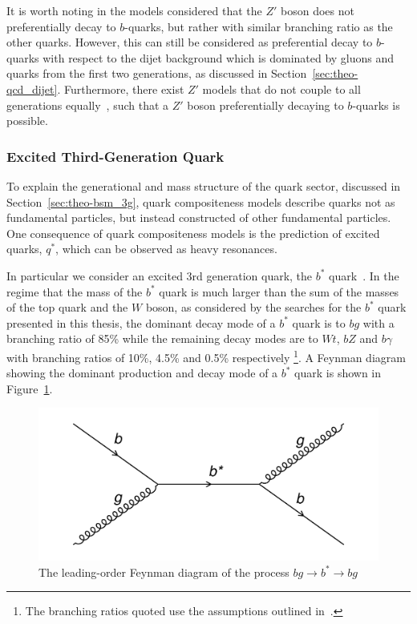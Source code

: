 It is worth noting in the models considered that the $Z'$ boson does not preferentially decay to $b$-quarks, but rather with similar branching ratio as the other quarks.
However, this can still be considered as preferential decay to $b$-quarks with respect to the dijet background
which is dominated by gluons and quarks from the first two generations, as discussed in Section~\ref{sec:theo-qcd_dijet}.
Furthermore, there exist $Z'$ models that do not couple to all generations equally~\cite{theo-bsm_zprime_3g},
such that a $Z'$ boson preferentially decaying to $b$-quarks is possible.

\subsubsection{Excited Third-Generation Quark}
\label{sec:theo-bsm_bstar}

To explain the generational and mass structure of the quark sector, discussed in Section~\ref{sec:theo-bsm_3g},
quark compositeness models describe quarks not as fundamental particles, but instead constructed of other fundamental particles.
One consequence of quark compositeness models is the prediction of excited quarks, $q^{*}$, which can be observed as heavy resonances.

In particular we consider an excited 3rd generation quark, the $b^{*}$ quark~\cite{theo-bsm_bstar}.
In the regime that the mass of the $b^{*}$ quark is much larger than the sum of the masses of the top quark and the $W$ boson,
as considered by the searches for the $b^{*}$ quark presented in this thesis,
the dominant decay mode of a $b^{*}$ quark is to $bg$ with a branching ratio of 85\%
while the remaining decay modes are to $Wt$, $bZ$ and $b\gamma$ with branching ratios of 10\%, 4.5\% and 0.5\% respectively
\footnote{The branching ratios quoted use the assumptions outlined in~\cite{theo-bsm_bstar}.}.
A Feynman diagram showing the  dominant production and decay mode of a $b^*$ quark is shown in Figure~\ref{fig:theo-bsm_bstar}.

\begin{figure}[!hbt]
  \begin{center}
    \includegraphics[width=0.7\linewidth, angle=0]{figs/Theory/bsm_bstar.png}
  \end{center}
  \caption{The leading-order Feynman diagram of the process $bg \to b^* \to bg$}
  \label{fig:theo-bsm_bstar}
\end{figure}


